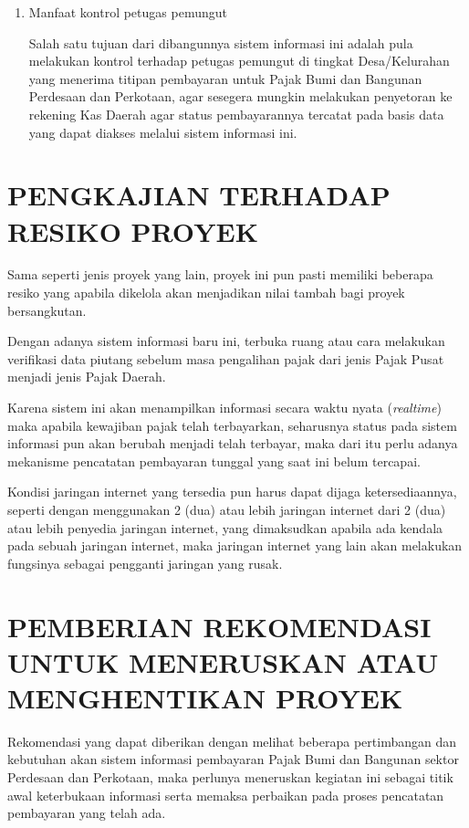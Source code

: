 \documentclass[pdftex,12pt, oneside]{article}
\begin{document}
\begin{enumerate}
\begin{enumerate}
	\item Manfaat kontrol petugas pemungut
	
Salah satu tujuan dari dibangunnya sistem informasi ini adalah pula melakukan kontrol terhadap petugas pemungut di tingkat Desa/Kelurahan yang menerima titipan pembayaran untuk Pajak Bumi dan Bangunan Perdesaan dan Perkotaan, agar sesegera mungkin melakukan penyetoran ke rekening Kas Daerah agar status pembayarannya tercatat pada basis data yang dapat diakses melalui sistem informasi ini.	
	
\end{enumerate}	
	
\end{enumerate}

\section{PENGKAJIAN TERHADAP RESIKO PROYEK}

Sama seperti jenis proyek yang lain, proyek ini pun pasti memiliki beberapa resiko yang apabila dikelola akan menjadikan nilai tambah bagi proyek bersangkutan. 

Dengan adanya sistem informasi baru ini, terbuka ruang atau cara melakukan verifikasi data piutang sebelum masa pengalihan pajak dari jenis Pajak Pusat menjadi jenis Pajak Daerah.

Karena sistem ini akan menampilkan informasi secara waktu nyata (\textit{realtime}) maka apabila kewajiban pajak telah terbayarkan, seharusnya status pada sistem informasi pun akan berubah menjadi telah terbayar, maka dari itu perlu adanya mekanisme pencatatan pembayaran tunggal yang saat ini belum tercapai.

Kondisi jaringan internet yang tersedia pun harus dapat dijaga ketersediaannya, seperti dengan menggunakan 2 (dua) atau lebih jaringan internet dari 2 (dua) atau lebih penyedia jaringan internet, yang dimaksudkan apabila ada kendala pada sebuah jaringan internet, maka jaringan internet yang lain akan melakukan fungsinya sebagai pengganti jaringan yang rusak.

\section{PEMBERIAN REKOMENDASI UNTUK MENERUSKAN ATAU MENGHENTIKAN PROYEK}

Rekomendasi yang dapat diberikan dengan melihat beberapa pertimbangan dan kebutuhan akan sistem informasi pembayaran Pajak Bumi dan Bangunan sektor Perdesaan dan Perkotaan, maka perlunya meneruskan kegiatan ini sebagai titik awal keterbukaan informasi serta memaksa perbaikan pada proses pencatatan pembayaran yang telah ada.
\end{document}

